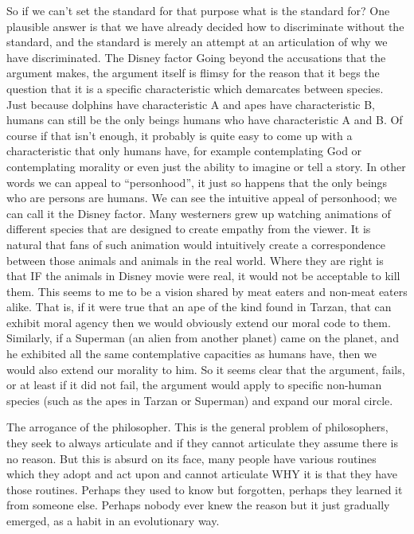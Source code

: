 So if we can’t set the standard for that purpose what is the standard for? One plausible answer is that we have already decided how to discriminate without the standard, and the standard is merely an attempt at an articulation of why we have discriminated. 
The Disney factor
Going beyond the accusations that the argument makes, the argument itself is flimsy for the reason that it begs the question that it is a specific characteristic which demarcates between species. Just because dolphins have characteristic A and apes have characteristic B, humans can still be the only beings humans who have characteristic A and B. Of course if that isn’t enough, it probably is quite easy to come up with a characteristic that only humans have, for example contemplating God or contemplating morality or even just the ability to imagine or tell a story. In other words we can appeal to “personhood”, it just so happens that the only beings who are persons are humans.
We can see the intuitive appeal of personhood; we can call it the Disney factor. Many westerners grew up watching animations of different species that are designed to create empathy from the viewer. It is natural that fans of such animation would intuitively create a correspondence between those animals and animals in the real world. Where they are right is that IF the animals in Disney movie were real, it would not be acceptable to kill them. This seems to me to be a vision shared by meat eaters and non-meat eaters alike. That is, if it were true that an ape of the kind found in Tarzan, that can exhibit moral agency then we would obviously extend our moral code to them. Similarly, if a Superman (an alien from another planet) came on the planet, and he exhibited all the same contemplative capacities as humans have, then we would also extend our morality to him.
So it seems clear that the argument, fails, or at least if it did not fail, the argument would apply to specific non-human species (such as the apes in Tarzan or Superman) and expand our moral circle.










The arrogance of the philosopher. 
This is the general problem of philosophers, they seek to always articulate and if they cannot articulate they assume there is no reason. 
But this is absurd on its face, many people have various routines which they adopt and act upon and cannot articulate WHY it is that they have those routines. Perhaps they used to know but forgotten, perhaps they learned it from someone else. Perhaps nobody ever knew the reason but it just gradually emerged, as a habit in an evolutionary way. 


